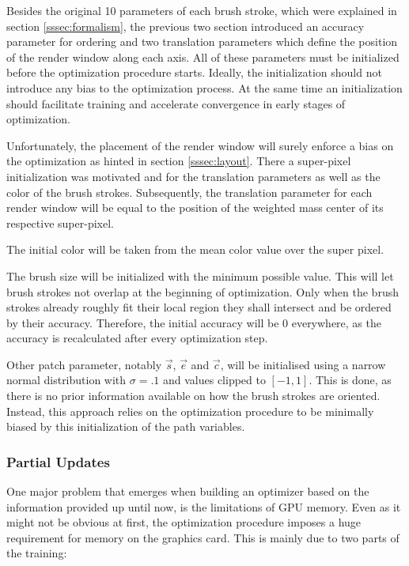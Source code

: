 Besides the original 10 parameters of each brush stroke, which were explained in
section \ref{sssec:formalism}, the previous two section introduced an accuracy
parameter for ordering and two translation parameters which define the position
of the render window along each axis.
All of these parameters must be initialized before the optimization procedure starts.
Ideally, the initialization should not introduce any bias to the optimization process.
At the same time an initialization should facilitate training and accelerate convergence
in early stages of optimization.

Unfortunately, the placement of the render window will surely enforce a bias on the
optimization as hinted in section \ref{sssec:layout}.
There a super-pixel initialization was motivated and for the translation parameters
as well as the color of the brush strokes.
Subsequently, the translation parameter for each render window will be equal to the
position of the weighted mass center of its respective super-pixel.

The initial color will be taken from the mean color value over the super pixel.

The brush size will be initialized with the minimum possible value.
This will let brush strokes not overlap at the beginning of optimization.
Only when the brush strokes already roughly fit their local region they shall intersect
and be ordered by their accuracy.
Therefore, the initial accuracy will be 0 everywhere, as the accuracy is recalculated
after every optimization step.

Other patch parameter, notably $\vec{s}$, $\vec{e}$ and $\vec{c}$, will be initialised
using a narrow normal distribution with $\sigma = .1$ and values clipped to $[-1, 1]$.
This is done, as there is no prior information available on how the brush strokes
are oriented.
Instead, this approach relies on the optimization procedure to be minimally biased
by this initialization of the path variables.

\subsubsection{Partial Updates}

One major problem that emerges when building an optimizer based on the information
provided up until now, is the limitations of GPU memory.
Even as it might not be obvious at first, the optimization procedure imposes a huge
requirement for memory on the graphics card.
This is mainly due to two parts of the training:

